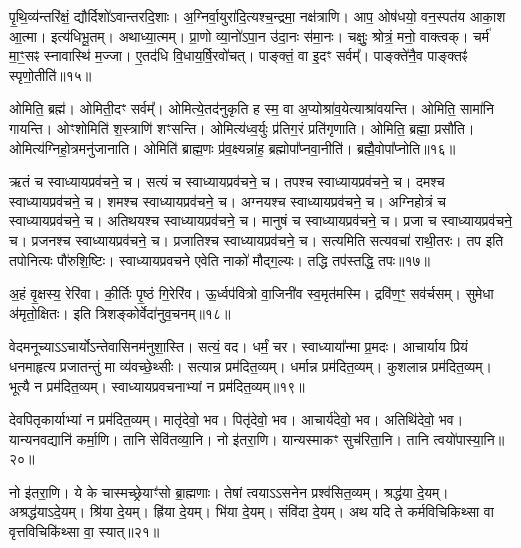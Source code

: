 पृ॒थि॒व्य॑न्तरि॑क्षं॒ द्यौर्दिशो॑ऽवान्तरदि॒शाः। 
अ॒ग्निर्वा॒युरा॑दि॒त्य\-श्च॒न्द्रमा॒ नक्ष॑त्राणि। 
आप॒ ओष॑धयो॒ वन॒स्पत॑य आका॒श आ॒त्मा। 
इत्य॑धि\-भू॒तम्। 
अथाध्या॒त्मम्। 
प्रा॒णो व्या॒नो॑ऽपा॒न उ॑दा॒नः स॑मा॒नः। 
चक्षुः॒ श्रोत्रं॒ मनो॒ वाक्त्वक्। 
चर्म॑ मा॒ꣳ॒सꣴ स्नावास्थि॑ म॒ज्जा। 
ए॒तद॑धि वि॒धाय॒\-र्\mbox{}षि॒\-रवो॑चत्। 
पाङ्क्तं॒ वा इ॒दꣳ सर्वम्᳚। 
पाङ्क्ते॑नै॒व पाङ्क्तꣴ॑ स्पृणो॒तीति॑॥१५॥
\anuvakamend[सर्व॒मेकं॑ च]

ओमिति॒ ब्रह्म॑। 
ओमिती॒दꣳ सर्वम्᳚। 
ओमित्ये॒तद॑नुकृति ह स्म॒ वा अ॒प्योश्रा॑व॒येत्याश्रा॑वयन्ति। 
ओमिति॒ सामा॑नि गायन्ति। 
ओꣳ\-शोमिति॑ श॒स्त्राणि॑ शꣳसन्ति। 
ओमित्य॑ध्व॒र्युः प्र॑तिग॒रं प्रति॑\-गृणाति। 
ओमिति॒ ब्रह्मा॒ प्रसौ॑ति। 
ओमित्य॑ग्निहो॒त्रमनु॑जानाति। 
ओमिति॑ ब्राह्म॒णः प्र॑व॒क्ष्यन्ना॑ह॒ ब्रह्मोपा᳚प्नवा॒नीति॑। 
ब्रह्मै॒वो\-पा᳚प्नोति॥१६॥%
\anuvakamend[ओन्दश॑]

ऋतं च स्वाध्याय\-प्रव॑चने॒ च। 
सत्यं च स्वाध्याय\-प्रव॑चने॒ च। 
तपश्च स्वाध्याय\-प्रव॑चने॒ च। 
दमश्च स्वाध्याय\-प्रव॑चने॒ च। 
शमश्च स्वाध्याय\-प्रव॑चने॒ च। 
अग्नयश्च स्वाध्याय\-प्रव॑चने॒ च। 
अग्निहोत्रं च स्वाध्याय\-प्रव॑चने॒ च। 
अतिथयश्च स्वाध्याय\-प्रव॑चने॒ च। 
मानुषं च स्वाध्याय\-प्रव॑चने॒ च। 
प्रजा च स्वाध्याय\-प्रव॑चने॒ च। 
प्रजनश्च स्वाध्याय\-प्रव॑चने॒ च। 
प्रजातिश्च स्वाध्याय\-प्रव॑चने॒ च। 
सत्यमिति सत्य\-वचा॑ राथी॒तरः। 
तप इति तपो\-नित्यः पौ॑रुशि॒ष्टिः। 
स्वाध्याय\-प्रवचने एवेति नाको॑ मौद्ग॒ल्यः। 
तद्धि तप॑स्तद्धि॒ तपः॥१७॥
\anuvakamend[प्रजा च स्वाध्याय\-प्रव॑चने॒ च षट्च॑]

अ॒हं वृ॒क्षस्य॒ रेरि॑वा। 
की॒र्तिः पृ॒ष्ठं गि॒रेरि॑व। 
ऊ॒र्ध्वप॑वित्रो वा॒जिनी॑व स्व॒मृत॑मस्मि। 
द्रवि॑ण॒ꣳ॒ सव॑र्चसम्। 
सुमेधा अ॑मृतो॒क्षितः। 
इति त्रिशङ्कोर्वेदा॑नुव॒चनम्॥१८॥
\anuvakamend[अ॒हꣳ षट्]

वेदमनूच्याऽऽचार्योऽन्तेवासिनम॑नुशा॒स्ति। 
सत्यं॒ वद। 
धर्मं॒ चर। 
स्वाध्याया᳚न्मा प्र॒मदः। 
आचार्याय प्रियं धनमाहृत्य प्रजातन्तुं मा व्य॑वच्छे॒थ्सीः। 
सत्यान्न प्रम॑दित॒व्यम्। 
धर्मान्न प्रम॑दित॒व्यम्। 
कुशलान्न प्रम॑दित॒व्यम्। 
भूत्यै न प्रम॑दित॒व्यम्। 
स्वाध्यायप्रवचनाभ्यां न प्रम॑दित॒व्यम्॥१९॥

देवपितृकार्याभ्यां न प्रम॑दित॒व्यम्। 
मातृ॑देवो॒ भव। 
पितृ॑देवो॒ भव। 
आचार्य॑देवो॒ भव। 
अतिथि॑देवो॒ भव। 
यान्यनवद्यानि॑ कर्मा॒णि। 
तानि सेवि॑तव्या॒नि। 
नो इ॑तरा॒णि। 
यान्यस्माकꣳ सुच॑रिता॒नि। 
तानि त्वयो॑पास्या॒नि॥२०॥

नो इ॑तरा॒णि। 
ये के चास्मच्छ्रेयाꣳ॑सो ब्रा॒ह्मणाः। 
तेषां त्वयाऽऽसनेन प्रश्व॑सित॒व्यम्। 
श्रद्ध॑या दे॒यम्। 
अश्रद्ध॑याऽदे॒यम्। 
श्रि॑या दे॒यम्। 
ह्रि॑या दे॒यम्। 
भि॑या दे॒यम्। 
संवि॑दा दे॒यम्। 
अथ यदि ते कर्मविचिकिथ्सा वा वृत्तविचिकि॑थ्सा वा॒ स्यात्॥२१॥

